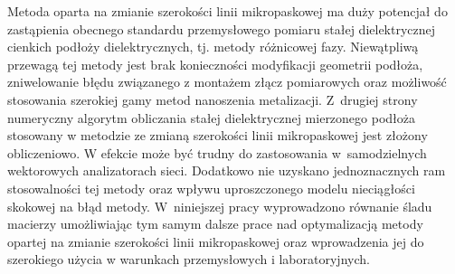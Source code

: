 Metoda oparta na zmianie szerokości linii mikropaskowej ma duży potencjał do zastąpienia obecnego standardu przemysłowego pomiaru stałej dielektrycznej cienkich podłoży dielektrycznych, tj. metody różnicowej fazy. Niewątpliwą przewagą tej metody jest brak konieczności modyfikacji geometrii podłoża, zniwelowanie błędu związanego z montażem złącz pomiarowych oraz możliwość stosowania szerokiej gamy metod nanoszenia metalizacji. Z~drugiej strony numeryczny algorytm obliczania stałej dielektrycznej mierzonego podłoża stosowany w metodzie ze zmianą szerokości linii mikropaskowej jest złożony obliczeniowo. W efekcie może być trudny do zastosowania w~samodzielnych wektorowych analizatorach sieci. Dodatkowo nie uzyskano jednoznacznych ram stosowalności tej metody oraz wpływu uproszczonego modelu nieciągłości skokowej na błąd metody. W~niniejszej pracy wyprowadzono równanie śladu macierzy umożliwiając tym samym dalsze prace nad optymalizacją metody opartej na zmianie szerokości linii mikropaskowej oraz wprowadzenia jej do szerokiego użycia w warunkach przemysłowych i laboratoryjnych.

